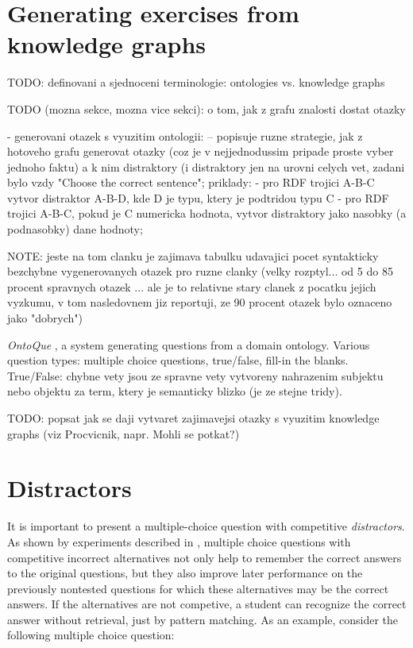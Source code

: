 \documentclass[a4paper, 12pt, twoside]{fithesis2}		%
\renewcommand{\_}{\leavevmode \kern0.0em\vbox{\hrule width0.4em}}
\newcounter{choice}
\begin{document}
\section{Generating exercises from knowledge graphs}
\label{sec:irt}

TODO: definovani a sjednoceni terminologie: ontologies vs. knowledge graphs

TODO (mozna sekce, mozna vice sekci): o tom, jak z grafu znalosti dostat otazky

- generovani otazek s vyuzitim ontologii:
\cite{question-gen-domain-ontologies} -- popisuje ruzne strategie, jak z hotoveho grafu generovat otazky (coz je v nejjednodussim pripade proste vyber jednoho faktu) a k nim distraktory (i distraktory jen na urovni celych vet, zadani bylo vzdy "Choose the correct sentence"; priklady:
- pro RDF trojici A-B-C vytvor distraktor A-B-D, kde D je typu, ktery je podtridou typu C
- pro RDF trojici A-B-C, pokud je C numericka hodnota, vytvor distraktory jako nasobky (a podnasobky) dane hodnoty;

NOTE: jeste na tom clanku je zajimava tabulku udavajici pocet syntakticky bezchybne vygenerovanych otazek pro ruzne clanky (velky rozptyl... od 5 do 85 procent spravnych otazek ... ale je to relativne stary clanek z pocatku jejich vyzkumu, v tom nasledovnem jiz reportuji, ze 90 procent otazek bylo oznaceno jako "dobrych")

\textit{OntoQue} \cite{ontoque}, a system generating questions from a domain ontology.
Various question types: multiple choice questions, true/false, fill-in the blanks.
True/False: chybne vety jsou ze spravne vety vytvoreny nahrazenim subjektu nebo objektu za term, ktery je semanticky blizko (je ze stejne tridy).


TODO: popsat jak se daji vytvaret zajimavejsi otazky s vyuzitim knowledge graphs (viz Procvicnik, napr. Mohli se potkat?)


\section{Distractors}
\label{sec:distractors}

It is important to present a multiple-choice question with competitive \textit{distractors}.
As shown by experiments described in \cite{optimizing-multiple-choice}, multiple choice questions with competitive incorrect alternatives not only help to remember the correct answers to the original questions, but they also improve later performance on the previously nontested questions for which these alternatives may be the correct answers. If the alternatives are not competive, a student can recognize the correct answer without retrieval, just by pattern matching. As an example, consider the following multiple choice question:
\end{document}
